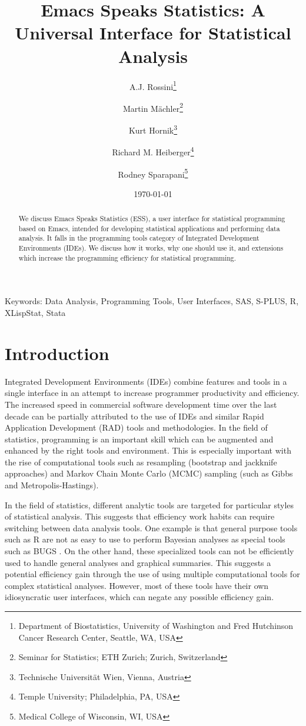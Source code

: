 \documentclass{article}
\title{Emacs Speaks Statistics: A Universal Interface for
  Statistical Analysis}
\author{A.J. Rossini\footnote{Department of Biostatistics, University
    of Washington and Fred Hutchinson Cancer Research Center, Seattle,
    WA, USA} \and Martin M{\"a}chler\footnote{Seminar for Statistics;
    ETH Zurich; Zurich, Switzerland} \and Kurt
  Hornik\footnote{Technische Universit{\"a}t Wien, Vienna, Austria}
  \and Richard M. Heiberger\footnote{Temple University; Philadelphia,
    PA, USA} \and Rodney Sparapani\footnote{Medical College of
    Wisconsin, WI, USA}}
\date{\today}
\newif\ifpdf
\begin{document}
\ifpdf
  \DeclareGraphicsExtensions{.jpg,.pdf,.png,.mps}
\fi


\maketitle

Keywords: Data Analysis, Programming Tools, User Interfaces, SAS,
S-PLUS, R, XLispStat, Stata

\begin{abstract}
  We discuss Emacs Speaks Statistics (ESS), a user interface for
  statistical programming based on Emacs, intended for developing
  statistical applications and performing data analysis.  It falls in
  the programming tools category of Integrated Development
  Environments (IDEs).  We discuss how it works, why one should use
  it, and extensions which increase the programming efficiency for
  statistical programming.
\end{abstract}

\section{Introduction}
\label{sec:intro}

Integrated Development Environments (IDEs) combine features and tools
in a single interface in an attempt to increase programmer
productivity and efficiency.  The increased speed in commercial
software development time over the last decade can be partially
attributed to the use of IDEs and similar Rapid Application
Development (RAD) tools and methodologies.  In the field of
statistics, programming is an important skill which can be augmented
and enhanced by the right tools and environment.  This is especially
important with the rise of computational tools such as resampling
(bootstrap and jackknife approaches) and Markov Chain Monte Carlo
(MCMC) sampling (such as Gibbs and Metropolis-Hastings).

In the field of statistics, different analytic tools are targeted for
particular styles of statistical analysis.  This suggests that
efficiency work habits can require switching between data analysis
tools.  One example is that general purpose tools such as R
\citep{ihak:gent:1996} are not as easy to use to perform Bayesian
analyses as special tools such as BUGS \citep{SpieThomBest:1999}.  On
the other hand, these specialized tools can not be efficiently used to
handle general analyses and graphical summaries.  This suggests a
potential efficiency gain through the use of using multiple
computational tools for complex statistical analyses.  However, most
of these tools have their own idiosyncratic user interfaces, which can
negate any possible efficiency gain.
\end{document}

